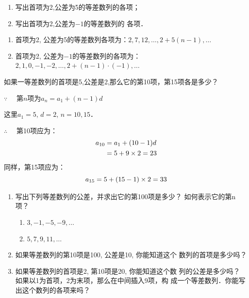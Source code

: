 \begin{example}
\begin{enumerate}
    \item 写出首项为2,公差为5的等差数列的各项；
    \item 写出首项为2,公差为$-1$的等差数列的
各项．
\end{enumerate}    
\end{example}

\begin{solution}
\begin{enumerate}
    \item 首项为2, 公差为5的等差数列各项为：$2, 7, 12, \ldots, 2+5 (n-1) ,\ldots$
    \item 首项为2, 公差为$-1$的等差数列的各项为：
    $2, 1, 0, -1, -2, \ldots, 2+ (n-1)\cdot(-1) ,\ldots$
\end{enumerate}
\end{solution}

\begin{example}
    如果一等差数列的首项是5,公差是2,那么它的第10项，第15项各是多少？
\end{example}

\begin{solution}
   $\because\quad $ 第$n$项为$a_n=a_1+(n-1)d$

这里$a_1=5$, $d=2$, $n=10, 15$．

$\therefore\quad $ 第10项应为：
\[\begin{split}
    a_{10}&=a_1+ (10-1) d\\
&=5+9\times2=23
\end{split}\]
同样，第15项应为：
\[a_{15}=5+ (15-1) \times2=33\]
\end{solution}

\begin{ex}
\begin{enumerate}
\item 写出下列等差数列的公差，并求出它的第100项是多少？
如何表示它的第n项？
\begin{enumerate}
    \item $3, -1, -5, -9, \ldots$
    \item $5, 7, 9, 11, \ldots$
\end{enumerate} 
\item 如果等差数列的第10项是100, 公差是10, 你能知道这个
数列的首项是多少吗？
\item 如果等差数列的首项是2, 第10项是20, 你能知道这个数
列的公差是多少吗？
\staritem 如果以1为首项，2为末项，那么在中间插入9项，构
成一个等差数列．你能写出这个数列的各项来吗？
\end{enumerate}
\end{ex}

